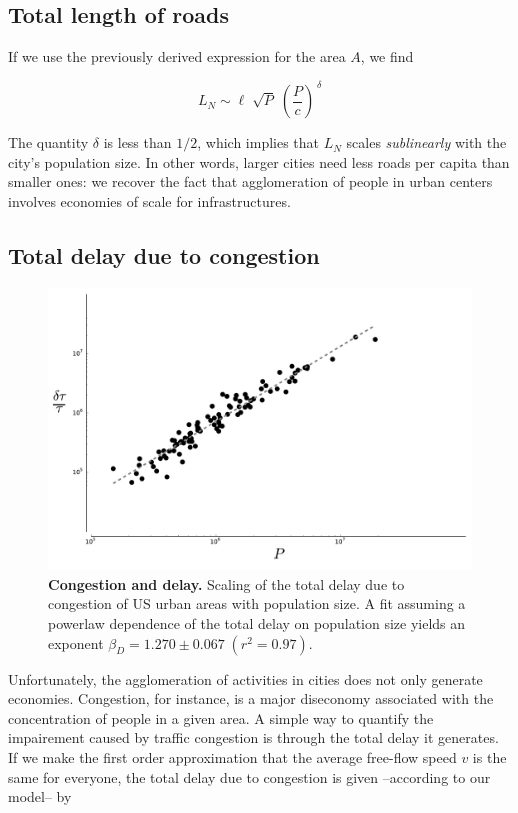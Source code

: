 \subsection{Total length of roads}

If we use the previously derived expression for the area $A$, we find

\begin{equation}
    L_N \sim \ell \; \sqrt{P}\; \left(\frac{P}{c}\right)^{\,\delta}
\end{equation}

The quantity $\delta$ is less than $1/2$, which implies that $L_N$ scales
\emph{sublinearly} with the city's population size. In other words, larger
cities need less roads per capita than smaller ones: we recover the fact that
agglomeration of people in urban centers involves economies of scale for
infrastructures. 


\subsection{Total delay due to congestion}

\begin{figure}
    \centering
    \includegraphics[width=\textwidth]{gfx/chapter-scaling/scaling_delay.pdf}
    \caption{{\bf Congestion and delay.} Scaling of the total delay due to congestion of US urban areas with
    population size. A fit assuming a powerlaw dependence of the total delay on
population size yields an exponent $\beta_D = 1.270 \pm 0.067\;(r^2=0.97)$.\label{fig:scaling_delay}}
\end{figure}

Unfortunately, the agglomeration of activities in cities does not only generate economies.
Congestion, for instance, is a major diseconomy associated with the
concentration of people in a given area. A simple way to quantify the
impairement caused by traffic congestion is through the total delay it
generates. If we make the first order approximation that the average free-flow
speed $v$ is the same for everyone, the total delay due to congestion is given
--according to our model-- by

